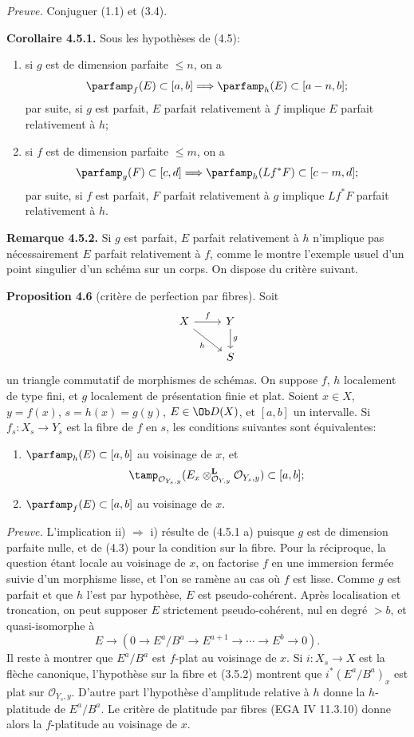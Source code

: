 \documentclass[11pt]{article}
\begin{document}
\emph{Preuve.} Conjuguer (1.1) et (3.4).

\textbf{Corollaire 4.5.1.} Sous les hypothèses de (4.5):
\begin{enumerate}[label=\alph*)]
\item si \(g\) est de dimension parfaite \(\leq n\), on a
\[
 \parfamp_f(E)
 \subset[a,b]
 \Longrightarrow
 \parfamp_h(E)
 \subset[a-n,b];
\]
par suite, si \(g\) est parfait, \(E\) parfait relativement à \(f\) implique \(E\) parfait relativement à \(h\);
\item si \(f\) est de dimension parfaite \(\leq m\), on a
\[
 \parfamp_g(F)
 \subset[c,d]
 \Longrightarrow
 \parfamp_h(Lf^*F)
 \subset[c-m,d];
\]
par suite, si \(f\) est parfait, \(F\) parfait relativement à \(g\) implique \(Lf^*F\) parfait relativement à \(h\).
\end{enumerate}

\textbf{Remarque 4.5.2.} Si \(g\) est parfait, \(E\) parfait relativement à \(h\) n'implique pas nécessairement \(E\) parfait relativement à \(f\), comme le montre l'exemple usuel d'un point singulier d'un schéma sur un corps. On dispose du critère suivant.

\textbf{Proposition 4.6} (critère de perfection par fibres). Soit
\[
\begin{tikzcd}
X \arrow[r,"f"] \arrow[dr,"h"'] & Y \arrow[d,"g"]\\
& S
\end{tikzcd}
\]
un triangle commutatif de morphismes de schémas. On suppose \(f\), \(h\) localement de type fini, et \(g\) localement de présentation finie et plat. Soient \(x\in X\), \(y=f(x)\), \(s=h(x)=g(y)\), \(E\in\Ob D(X)\), et \([a,b]\) un intervalle. Si \(f_s:X_s\to Y_s\) est la fibre de \(f\) en \(s\), les conditions suivantes sont équivalentes:
\begin{enumerate}[label=\roman*)]
\item \(\parfamp_h(E)\subset[a,b]\) au voisinage de \(x\), et
\[
 \tamp_{\mathcal O_{Y_s,y}}(E_x\otimes_{\mathcal O_{Y,y}}^{\mathbf L}\mathcal O_{Y_s,y})
 \subset[a,b];
\]
\item \(\parfamp_f(E)\subset[a,b]\) au voisinage de \(x\).
\end{enumerate}

\emph{Preuve.} L'implication ii) \(\Rightarrow\) i) résulte de (4.5.1 a) puisque \(g\) est de dimension parfaite nulle, et de (4.3) pour la condition sur la fibre. Pour la réciproque, la question étant locale au voisinage de \(x\), on factorise \(f\) en une immersion fermée suivie d'un morphisme lisse, et l'on se ramène au cas où \(f\) est lisse. Comme \(g\) est parfait et que \(h\) l'est par hypothèse, \(E\) est pseudo-cohérent. Après localisation et troncation, on peut supposer \(E\) strictement pseudo-cohérent, nul en degré \(>b\), et quasi-isomorphe à
\[
 E\longrightarrow(0\to E^a/B^a\to E^{a+1}\to\cdots\to E^b\to0).
\]
Il reste à montrer que \(E^a/B^a\) est \(f\)-plat au voisinage de \(x\). Si \(i:X_s\to X\) est la flèche canonique, l'hypothèse sur la fibre et (3.5.2) montrent que \(i^*(E^a/B^a)_x\) est plat sur \(\mathcal O_{Y_s,y}\). D'autre part l'hypothèse d'amplitude relative à \(h\) donne la \(h\)-platitude de \(E^a/B^a\). Le critère de platitude par fibres (EGA IV 11.3.10) donne alors la \(f\)-platitude au voisinage de \(x\).
\end{document}
